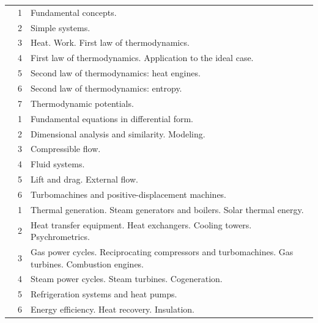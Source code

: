 \documentclass[11pt]{article}
\begin{document}
{\begin{xltabular}{\textwidth}{@{}>{\raggedright\arraybackslash}p{5.0cm}r>{\raggedright\arraybackslash}X@{}}
 & 1 & Fundamental concepts. \\*
 & 2 & Simple systems. \\*
 & 3 & Heat. Work. First law of thermodynamics. \\*
 & 4 & First law of thermodynamics. Application to the ideal case. \\*
 & 5 & Second law of thermodynamics: heat engines. \\*
 & 6 & Second law of thermodynamics: entropy. \\*
 & 7 & Thermodynamic potentials. \\
\midrule

 & 1 & Fundamental equations in differential form. \\*
 & 2 & Dimensional analysis and similarity. Modeling. \\*
 & 3 & Compressible flow. \\*
 & 4 & Fluid systems. \\*
 & 5 & Lift and drag. External flow. \\*
 & 6 & Turbomachines and positive-displacement machines. \\
\midrule

 & 1 & Thermal generation. Steam generators and boilers. Solar thermal energy. \\*
 & 2 & Heat transfer equipment. Heat exchangers. Cooling towers. Psychrometrics. \\*
 & 3 & Gas power cycles. Reciprocating compressors and turbomachines. Gas turbines. Combustion engines. \\*
 & 4 & Steam power cycles. Steam turbines. Cogeneration. \\*
 & 5 & Refrigeration systems and heat pumps. \\*
 & 6 & Energy efficiency. Heat recovery. Insulation. \\
\midrule


\end{xltabular}}
\end{document}
